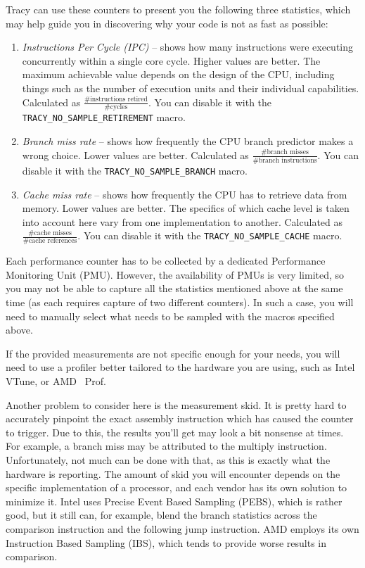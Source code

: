 \documentclass[hidelinks,titlepage,a4paper]{article}
\begin{document}
Tracy can use these counters to present you the following three statistics, which may help guide you in discovering why your code is not as fast as possible:

\begin{enumerate}
\item \emph{Instructions Per Cycle (IPC)} -- shows how many instructions were executing concurrently within a single core cycle. Higher values are better. The maximum achievable value depends on the design of the CPU, including things such as the number of execution units and their individual capabilities. Calculated as $\frac{\text{\#instructions retired}}{\text{\#cycles}}$. You can disable it with the \texttt{TRACY\_NO\_SAMPLE\_RETIREMENT} macro.
\item \emph{Branch miss rate} -- shows how frequently the CPU branch predictor makes a wrong choice. Lower values are better. Calculated as $\frac{\text{\#branch misses}}{\text{\#branch instructions}}$. You can disable it with the \texttt{TRACY\_NO\_SAMPLE\_BRANCH} macro.
\item \emph{Cache miss rate} -- shows how frequently the CPU has to retrieve data from memory. Lower values are better. The specifics of which cache level is taken into account here vary from one implementation to another. Calculated as $\frac{\text{\#cache misses}}{\text{\#cache references}}$. You can disable it with the \texttt{TRACY\_NO\_SAMPLE\_CACHE} macro.
\end{enumerate}

Each performance counter has to be collected by a dedicated Performance Monitoring Unit (PMU). However, the availability of PMUs is very limited, so you may not be able to capture all the statistics mentioned above at the same time (as each requires capture of two different counters). In such a case, you will need to manually select what needs to be sampled with the macros specified above.

If the provided measurements are not specific enough for your needs, you will need to use a profiler better tailored to the hardware you are using, such as Intel VTune, or AMD \si{\micro\relax}Prof.

Another problem to consider here is the measurement skid. It is pretty hard to accurately pinpoint the exact assembly instruction which has caused the counter to trigger. Due to this, the results you'll get may look a bit nonsense at times. For example, a branch miss may be attributed to the multiply instruction. Unfortunately, not much can be done with that, as this is exactly what the hardware is reporting. The amount of skid you will encounter depends on the specific implementation of a processor, and each vendor has its own solution to minimize it. Intel uses Precise Event Based Sampling (PEBS), which is rather good, but it still can, for example, blend the branch statistics across the comparison instruction and the following jump instruction. AMD employs its own Instruction Based Sampling (IBS), which tends to provide worse results in comparison.
\end{document}
